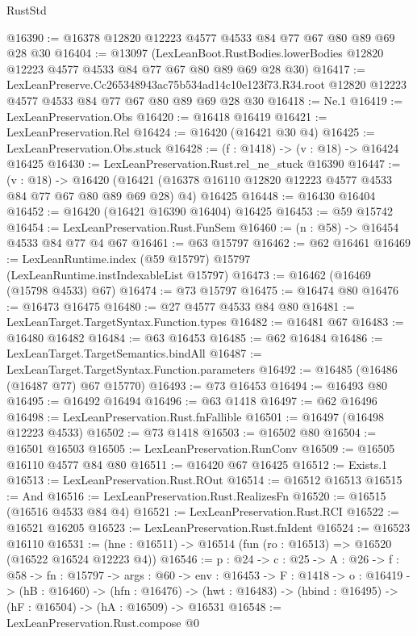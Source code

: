 \begin{lexlean}{RustStd}
\begin{coremodule}
@16390 := @16378 @12820 @12223 @4577 @4533 @84 @77 @67 @80 @89 @69 @28 @30
@16404 := @13097
    (LexLeanBoot.RustBodies.lowerBodies @12820 @12223 @4577 @4533 @84 @77 @67 @80 @89 @69 @28 @30)
@16417 := LexLeanPreserve.Cc265348943ac75b534ad14c10e123f73.R34.root
    @12820
    @12223
    @4577
    @4533
    @84
    @77
    @67
    @80
    @89
    @69
    @28
    @30
@16418 := Ne.{1}
@16419 := LexLeanPreservation.Obs
@16420 := @16418 @16419
@16421 := LexLeanPreservation.Rel
@16424 := @16420 (@16421 @30 @4)
@16425 := LexLeanPreservation.Obs.stuck
@16428 := (f : @1418) -> (v : @18) -> @16424 @16425
@16430 := LexLeanPreservation.Rust.rel_ne_stuck @16390
@16447 := (v : @18) ->
  @16420 (@16421 (@16378 @16110 @12820 @12223 @4577 @4533 @84 @77 @67 @80 @89 @69 @28) @4) @16425
@16448 := @16430 @16404
@16452 := @16420 (@16421 @16390 @16404) @16425
@16453 := @59 @15742
@16454 := LexLeanPreservation.Rust.FunSem
@16460 := (n : @58) -> @16454 @4533 @84 @77 @4 @67
@16461 := @63 @15797
@16462 := @62 @16461
@16469 := LexLeanRuntime.index (@59 @15797) @15797 (LexLeanRuntime.instIndexableList @15797)
@16473 := @16462 (@16469 (@15798 @4533) @67)
@16474 := @73 @15797
@16475 := @16474 @80
@16476 := @16473 @16475
@16480 := @27 @4577 @4533 @84 @80
@16481 := LexLeanTarget.TargetSyntax.Function.types
@16482 := @16481 @67
@16483 := @16480 @16482
@16484 := @63 @16453
@16485 := @62 @16484
@16486 := LexLeanTarget.TargetSemantics.bindAll
@16487 := LexLeanTarget.TargetSyntax.Function.parameters
@16492 := @16485 (@16486 (@16487 @77) @67 @15770)
@16493 := @73 @16453
@16494 := @16493 @80
@16495 := @16492 @16494
@16496 := @63 @1418
@16497 := @62 @16496
@16498 := LexLeanPreservation.Rust.fnFallible
@16501 := @16497 (@16498 @12223 @4533)
@16502 := @73 @1418
@16503 := @16502 @80
@16504 := @16501 @16503
@16505 := LexLeanPreservation.RunConv
@16509 := @16505 @16110 @4577 @84 @80
@16511 := @16420 @67 @16425
@16512 := Exists.{1}
@16513 := LexLeanPreservation.Rust.ROut
@16514 := @16512 @16513
@16515 := And
@16516 := LexLeanPreservation.Rust.RealizesFn
@16520 := @16515 (@16516 @4533 @84 @4)
@16521 := LexLeanPreservation.Rust.RCI
@16522 := @16521 @16205
@16523 := LexLeanPreservation.Rust.fnIdent
@16524 := @16523 @16110
@16531 := (hne : @16511) -> @16514 (fun (ro : @16513) => @16520 (@16522 @16524 @12223 @4))
@16546 := {p : @24} ->
  {c : @25} ->
  {A : @26} ->
  {f : @58} ->
  {fn : @15797} ->
  {args : @60} ->
  {env : @16453} ->
  {F : @1418} ->
  {o : @16419} ->
  (hB : @16460) ->
  (hfn : @16476) -> (hwt : @16483) -> (hbind : @16495) -> (hF : @16504) -> (hA : @16509) -> @16531
@16548 := LexLeanPreservation.Rust.compose @0

\end{coremodule}
\end{lexlean}

